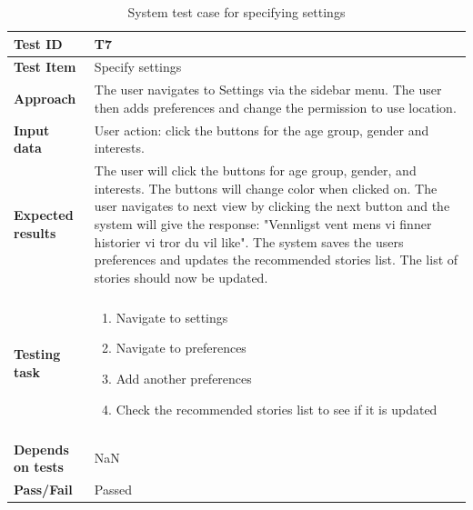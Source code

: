 \begin{appendices}
	\begin{table}[H]
		\centering
		\caption{System test case for specifying settings}
		\begin{tabular}{ | l | l  |}
			\hline
			\textbf{Test ID} & T7  \\ \hline
			\textbf{Test Item} & Specify settings \\ \hline
			\textbf{Approach} & \begin{minipage}{5in}The user navigates to Settings via the sidebar menu. The user then adds preferences and change the permission to use location. \end{minipage}\\ \hline		
			\textbf{Input data} &  \begin{minipage}{5in}User action: click the buttons for the age group, gender and interests. \end{minipage}\\ \hline
			\textbf{Expected results} &  \begin{minipage}{5in}The user will click the buttons for age group, gender, and interests. The buttons will change color when clicked on. The user navigates to next view by clicking the next button and the system will give the response: "Vennligst vent mens vi finner historier vi tror du vil like". 
			The system saves the users preferences and updates the recommended stories list. The list of stories should now be updated.  \end{minipage}\\ \hline&\\[-3.8ex]
			\textbf{Testing task} & \begin{minipage}{5in}
			\begin{enumerate}[noitemsep]
				\item Navigate to settings
				\item Navigate to preferences
				\item Add another preferences
				\item Check the recommended stories list to see if it is updated

			\end{enumerate}\end{minipage}
			\\ &\\[-3.8ex]\hline
			\textbf{Depends on tests} & NaN \\ \hline		
			\textbf{Pass/Fail} & Passed \\\hline			
		\end{tabular}
	\label{Tab:systemTesting7}
	\end{table}


\end{appendices}
